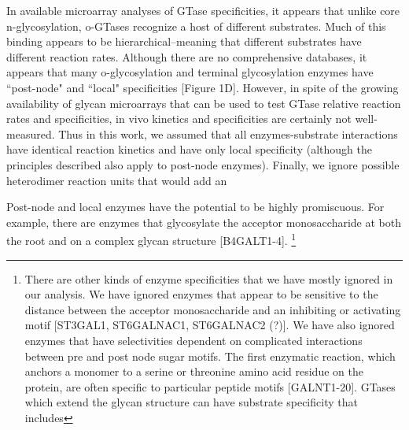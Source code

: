 \documentclass[twocolumn]{article}
\begin{document}
In available microarray analyses of GTase specificities, it appears that unlike core n-glycosylation, o-GTases recognize a host of different substrates. Much of this binding appears to be hierarchical--meaning that different substrates have different reaction rates. Although there are no comprehensive databases, it appears that many o-glycosylation and terminal glycosylation enzymes have ``post-node" and ``local" specificities [Figure 1D]. However, in spite of the growing availability of glycan microarrays that can be used to test GTase relative reaction rates and specificities, in vivo kinetics and specificities are certainly not well-measured. Thus in this work, we assumed that all enzymes-substrate interactions have identical reaction kinetics and have only local specificity (although the principles described also apply to post-node enzymes). Finally, we ignore possible heterodimer reaction units that would add an


Post-node and local enzymes have the potential to be highly promiscuous. For example, there are enzymes that glycosylate the acceptor monosaccharide at both the root and on a complex glycan structure [B4GALT1-4].  \footnote{There are other kinds of enzyme specificities that we have mostly ignored in our analysis. We have ignored enzymes that appear to be sensitive to the distance between the acceptor monosaccharide and an inhibiting or activating motif  [ST3GAL1, ST6GALNAC1, ST6GALNAC2 (?)]. We have also ignored enzymes that have selectivities dependent on complicated interactions between pre and post node sugar motifs. The first enzymatic reaction, which anchors a monomer to a serine or threonine amino acid residue on the protein, are often specific to particular peptide motifs [GALNT1-20]. GTases which extend the glycan structure can have substrate specificity that includes }
\end{document}

